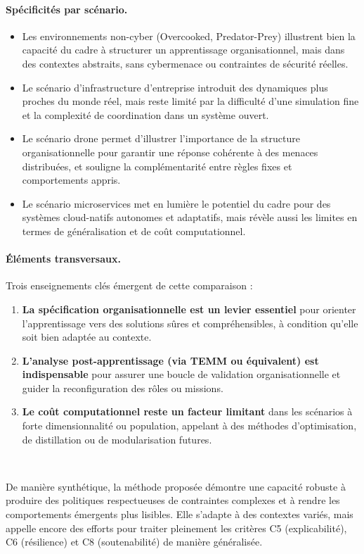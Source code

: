\paragraph{Spécificités par scénario.}
\begin{itemize}
  \item Les environnements non-cyber (Overcooked, Predator-Prey) illustrent bien la capacité du cadre à structurer un apprentissage organisationnel, mais dans des contextes abstraits, sans cybermenace ou contraintes de sécurité réelles.
  \item Le scénario d’infrastructure d’entreprise introduit des dynamiques plus proches du monde réel, mais reste limité par la difficulté d’une simulation fine et la complexité de coordination dans un système ouvert.
  \item Le scénario drone permet d’illustrer l’importance de la structure organisationnelle pour garantir une réponse cohérente à des menaces distribuées, et souligne la complémentarité entre règles fixes et comportements appris.
  \item Le scénario microservices met en lumière le potentiel du cadre pour des systèmes cloud-natifs autonomes et adaptatifs, mais révèle aussi les limites en termes de généralisation et de coût computationnel.
\end{itemize}

\paragraph{Éléments transversaux.} Trois enseignements clés émergent de cette comparaison :
\begin{enumerate}
  \item \textbf{La spécification organisationnelle est un levier essentiel} pour orienter l’apprentissage vers des solutions sûres et compréhensibles, à condition qu’elle soit bien adaptée au contexte.
  \item \textbf{L’analyse post-apprentissage (via TEMM ou équivalent) est indispensable} pour assurer une boucle de validation organisationnelle et guider la reconfiguration des rôles ou missions.
  \item \textbf{Le coût computationnel reste un facteur limitant} dans les scénarios à forte dimensionnalité ou population, appelant à des méthodes d’optimisation, de distillation ou de modularisation futures.
\end{enumerate}

\

De manière synthétique, la méthode proposée démontre une capacité robuste à produire des politiques respectueuses de contraintes complexes et à rendre les comportements émergents plus lisibles. Elle s’adapte à des contextes variés, mais appelle encore des efforts pour traiter pleinement les critères C5 (explicabilité), C6 (résilience) et C8 (soutenabilité) de manière généralisée.


